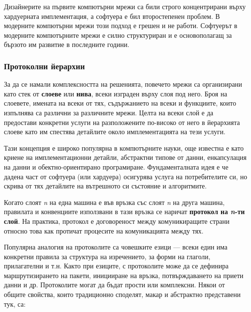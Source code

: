\documentclass[12pt,a4paper,oneside]{book}
\begin{document}
Дизайнерите на първите компютърни мрежи са били строго концентрирани върху
хардуерната имплементация, а софтуера е бил второстепенен проблем. В модерните
компютърни мрежи този подход е грешен и не работи. Софтуерът в модерните
компютърните мрежи е силно структуриран и е основополагащ за бързото им
развитие в последните години.

\subsubsection{Протоколни йерархии}

За да се намали комплексността на решенията, повечето мрежи са организирани като
стек от \textbf{слоеве} или \textbf{нива}, всеки изграден върху слоя под него.
Броя на слоевете, имената на всеки от тях, съдържанието на всеки и функциите,
които изпълнява са различни за различните мрежи. Целта на всеки слой е да
предостави конкретни услуги на разположените по-високо от него в йерархията
слоеве като им спестява детайлите около имплементацията на тези услуги. 

Тази концепция е широко популярна в компютърните науки, още известна е като
криене на имплементационни детайли, абстрактни типове от данни, енкапсулация на
данни и обектно-ориентирано програмиране. Фундаменталната идея е че дадена част
от софтуера (или хардуера) осигурява услуга на потребителите си, но скрива от
тях детайлите на вътрешното си състояние и алгоритмите.

Когато слоят \textit{n} на една машина е във връзка със слоят \textit{n} на
друга машина, правилата и конвенциите използвани в тази връзка се наричат
\textbf{протокол на \textit{n}-ти слой}. На практика, протокол е договореност
между комуникиращите страни относно това как протичат процесите на
комуникацията между тях.
\cite{tanenbaum_computer_2011}

Популярна аналогия на протоколите са човешките езици --- всеки един има
конкретни правила за структура на изречението, за форми на глаголи,
прилагателни и т.н.  Както при езиците, с протоколите може да се дефинира
маршрутизирането на пакети, иницииране на връзка, потвърждаването на приети
данни и др. Протоколите могат да бъдат прости или комплексни. Някои от общите
свойства, които традиционно споделят, макар и абстрактно представени тук, са:
\end{document}
